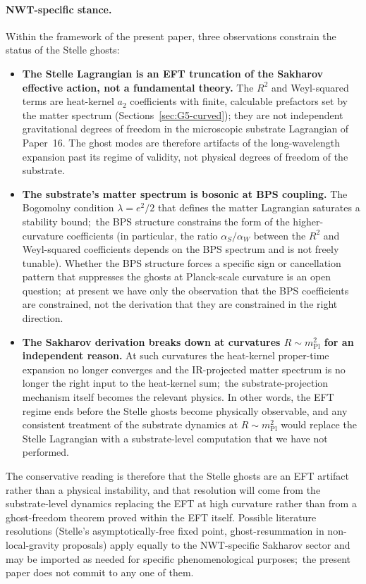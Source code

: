\documentclass[11pt]{article}
\newcommand{\mPl}{m_{\mathrm{Pl}}}
\begin{document}
\paragraph{NWT-specific stance.}
Within the framework of the present paper, three observations
constrain the status of the Stelle ghosts:
\begin{itemize}
\item \textbf{The Stelle Lagrangian is an EFT truncation of the
      Sakharov effective action, not a fundamental theory.}
      The $R^2$ and Weyl-squared terms are heat-kernel $a_2$
      coefficients with finite, calculable prefactors set by the
      matter spectrum (Sections~\ref{sec:G5-curved}); they are not
      independent gravitational degrees of freedom in the
      microscopic substrate Lagrangian of Paper~16.  The ghost modes
      are therefore artifacts of the long-wavelength expansion past
      its regime of validity, not physical degrees of freedom of
      the substrate.
\item \textbf{The substrate's matter spectrum is bosonic at BPS
      coupling.}  The Bogomolny condition $\lambda = e^2/2$ that
      defines the matter Lagrangian saturates a stability bound;\
      the BPS structure constrains the form of the
      higher-curvature coefficients (in particular, the ratio
      $\alpha_S/\alpha_W$ between the $R^2$ and Weyl-squared
      coefficients depends on the BPS spectrum and is not freely
      tunable).  Whether the BPS structure forces a specific sign or
      cancellation pattern that suppresses the ghosts at Planck-scale
      curvature is an open question;\ at present we have only the
      observation that the BPS coefficients are constrained, not the
      derivation that they are constrained in the right direction.
\item \textbf{The Sakharov derivation breaks down at curvatures
      $R \sim \mPl^2$ for an independent reason.}  At such curvatures
      the heat-kernel proper-time expansion no longer converges and
      the IR-projected matter spectrum is no longer the right input
      to the heat-kernel sum;\ the substrate-projection mechanism
      itself becomes the relevant physics.  In other words, the EFT
      regime ends before the Stelle ghosts become physically
      observable, and any consistent treatment of the substrate
      dynamics at $R \sim \mPl^2$ would replace the Stelle Lagrangian
      with a substrate-level computation that we have not performed.
\end{itemize}
The conservative reading is therefore that the Stelle ghosts are an
EFT artifact rather than a physical instability, and that resolution
will come from the substrate-level dynamics replacing the EFT at
high curvature rather than from a ghost-freedom theorem proved within
the EFT itself.  Possible literature resolutions (Stelle's asymptotically-free fixed
point, ghost-resummation in non-local-gravity proposals) apply
equally to the NWT-specific Sakharov sector and may be imported as
needed for specific phenomenological purposes;\ the present paper
does not commit to any one of them.
\end{document}
